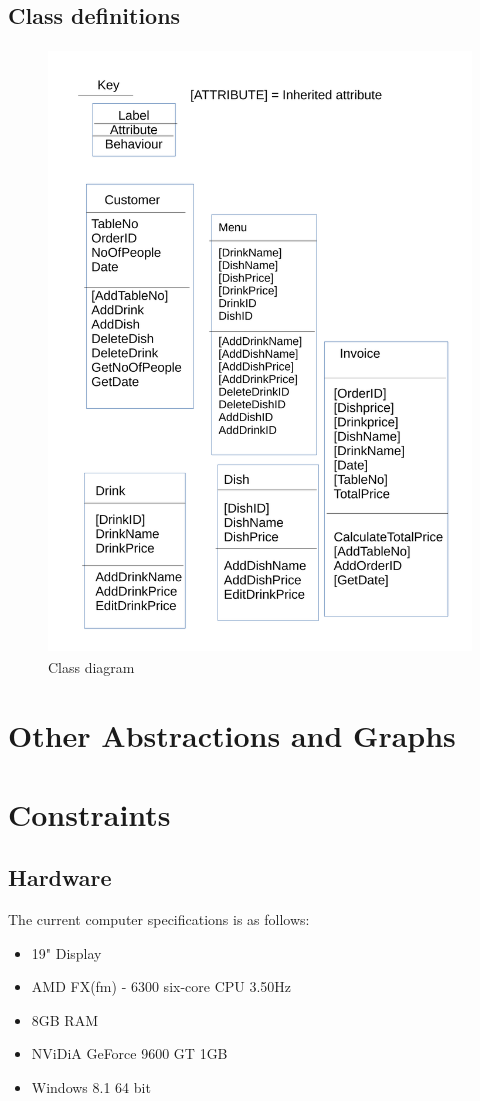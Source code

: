 \subsection{Class definitions}

\begin{figure}[H]
    \includegraphics[height = 16cm]{./Analysis/Keyfail}
    \caption{Class diagram} \label{fig:Class}
\end{figure}

\section{Other Abstractions and Graphs}

\section{Constraints}

\subsection{Hardware}
The current computer specifications is as follows:
\begin{itemize}
	\item 19" Display
	\item AMD FX(fm) - 6300 six-core CPU 3.50Hz
	\item 8GB RAM
	\item NViDiA GeForce 9600 GT 1GB
	\item Windows 8.1 64 bit
\end{itemize}

